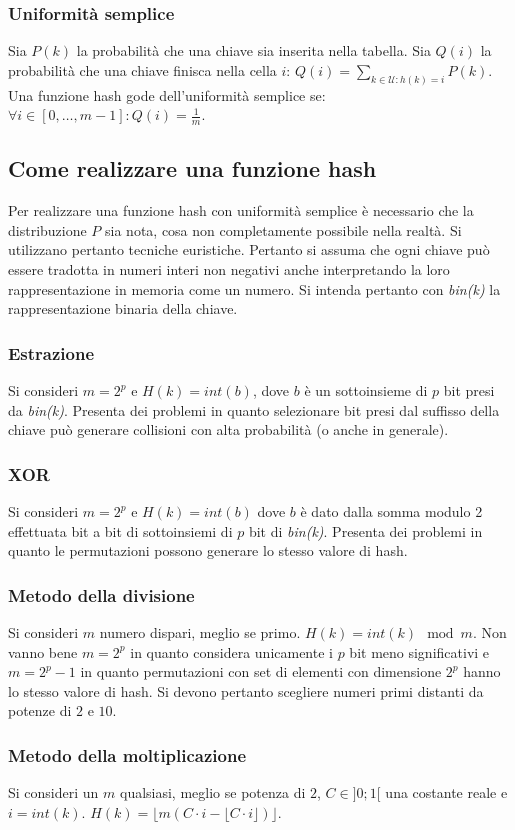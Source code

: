 \subsubsection{Uniformit\`a semplice}
Sia $P(k)$ la probabilit\`a che una chiave sia inserita nella tabella. Sia $Q(i)$ la probabilit\`a che una chiave finisca nella cella $i$: $Q(i)=
    \sum\limits_{k\in\mathcal{U}:h(k)=i}P(k)$. Una funzione hash gode dell'uniformit\`a semplice se: $\forall i\in [0,\dots, m-1]: Q(i)=\frac{1}{m}$.
\subsection{Come realizzare una funzione hash}
Per realizzare una funzione hash con uniformit\`a semplice \`e necessario che la distribuzione $P$ sia nota, cosa non completamente possibile nella
realt\`a. Si utilizzano pertanto tecniche euristiche. Pertanto si assuma che ogni chiave pu\`o essere tradotta in numeri interi non negativi anche
interpretando la loro rappresentazione in memoria come un numero. Si intenda pertanto con \emph{bin(k)} la rappresentazione binaria della chiave.
\subsubsection{Estrazione}
Si consideri $m=2^p$ e $H(k)=int(b)$, dove $b$ \`e un sottoinsieme di $p$ bit presi da \emph{bin(k)}. Presenta dei problemi in quanto selezionare bit presi
dal suffisso della chiave pu\`o generare collisioni con alta probabilit\`a (o anche in generale).
\subsubsection{XOR}
Si consideri $m=2^p$ e $H(k)=int(b)$ dove $b$ \`e dato dalla somma modulo 2 effettuata bit a bit di sottoinsiemi di $p$ bit di \emph{bin(k)}. Presenta dei
problemi in quanto le permutazioni possono generare lo stesso valore di hash.
\subsubsection{Metodo della divisione}
Si consideri $m$ numero dispari, meglio se primo. $H(k)=int(k)\mod m$. Non vanno bene $m=2^p$ in quanto considera unicamente i $p$ bit meno significativi
e $m= 2^p-1$ in quanto permutazioni con set di elementi con dimensione $2^p$ hanno lo stesso valore di hash. Si devono pertanto scegliere numeri primi
distanti da potenze di $2$ e $10$.
\subsubsection{Metodo della moltiplicazione}
Si consideri un $m$ qualsiasi, meglio se potenza di $2$, $C\in]0;1[$ una costante reale e $i=int(k)$. $H(k)=\lfloor m(C\cdot i-\lfloor C\cdot i\rfloor)
    \rfloor$.
